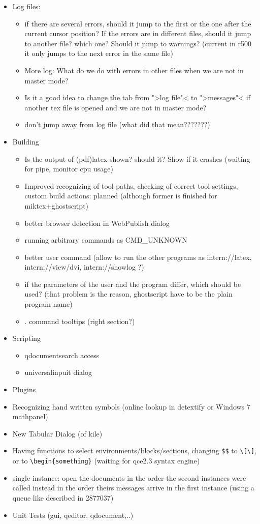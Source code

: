 \documentclass[10pt,a4paper,landscape]{report}
\begin{document}
\begin{itemize}
	\item Log files:\begin{itemize}
	\item if there are several errors, should it jump to the first or the one after the current cursor position? If the errors are in different files, should it jump to another file? which one? Should it jump to warnings? 	(current in r500 it only jumps to the next error in the same file) 
		\item More log: What do we do with errors in other files when we are not in master mode? 
		\item Is it a good idea to change the tab from ">log file"< to ">messages"< if another tex file is opened and we are not in master mode?
		\item don't jump away from log file (what did that mean???????)
	\end{itemize}
	\item Building \begin{itemize}
		\item Is the output of (pdf)latex shown? should it? Show if it crashes (waiting for pipe, monitor cpu usage)
		\item Improved recognizing of tool paths, checking of correct tool settings,  custom build actions: planned (although former is finished for miktex+ghostscript)
		\item better browser detection in WebPublish dialog 
		\item running arbitrary commands as CMD\_UNKNOWN
		\item better user command (allow to run the other programs as intern://latex, intern://view/dvi, intern://showlog ?)
		\item if the parameters of the user and the program differ, which should be used? (that problem is the reason, ghostscript have to be the plain program name)
		\item . command tooltips (right section?)
	\end{itemize}
	\item  Scripting
	\begin{itemize}
	\item qdocumentsearch access
	\item universalinpuit dialog
	\end{itemize}
	\item Plugins
	\item Recognizing hand written symbols (online lookup in detextify or Windows 7 mathpanel)
	\item New Tabular Dialog (of kile)
	\item Having functions to select environments/blocks/sections, changing \verb+$$+ to \verb+\[\]+, or to \verb+\begin{something}+ (waiting for qce2.3 syntax engine)
	\item single instance: open the documents in the order the second instances were called instead in the order theirs messages arrive in the first instance (using a queue like described in 2877037)
	\item Unit Tests (gui, qeditor, qdocument,..)
\end{itemize}
\end{document}
